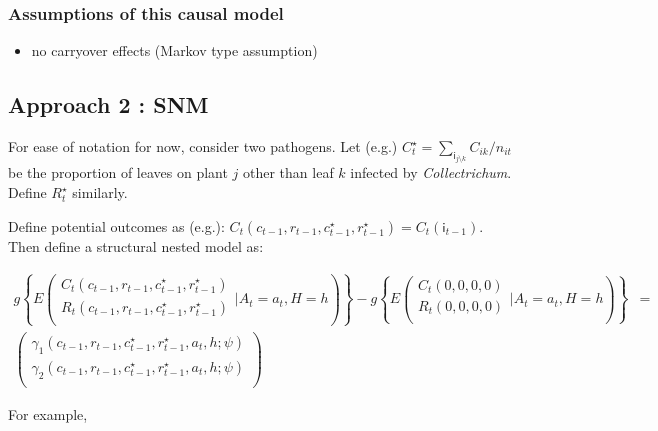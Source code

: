 \documentclass[]{article}
\providecommand{\tightlist}{%
  \setlength{\itemsep}{0pt}\setlength{\parskip}{0pt}}
\begin{document}
\hypertarget{causal_assumptions}{%
\subsubsection{Assumptions of this causal
model}\label{causal_assumptions}}

\begin{itemize}
\tightlist
\item
  no carryover effects (Markov type assumption)
\end{itemize}

\hypertarget{approach-2-snm}{%
\subsection{Approach 2 : SNM}\label{approach-2-snm}}

For ease of notation for now, consider two pathogens. Let (e.g.)
\(C^{\star}_t = \sum_{\mathsf{i}_{j \setminus k}} C_{ik}/n_{it}\) be the
proportion of leaves on plant \(j\) other than leaf \(k\) infected by
\emph{Collectrichum}. Define \(R^{\star}_t\) similarly.

Define potential outcomes as (e.g.):
\(C_t(c_{t-1}, r_{t-1}, c^{\star}_{t-1}, r^{\star}_{t-1}) = C_t(\mathsf{i}_{t -1})\).
Then define a structural nested model as:

\begin{align*}
g \left\{ E \left( 
 \begin{array}{l}
  C_t(c_{t-1}, r_{t-1}, c^{\star}_{t-1}, r^{\star}_{t-1}) \\
  R_t(c_{t-1}, r_{t-1}, c^{\star}_{t-1}, r^{\star}_{t-1}) \\
 \end{array} \bigg| A_t = a_t, H = h
\right)  \right\} -  
g \left\{ E \left( 
 \begin{array}{l}
  C_t(0, 0, 0, 0) \\
  R_t(0, 0, 0, 0) \\
 \end{array} \bigg| A_t = a_t, H = h
\right)  \right\} &= \\ 
\begin{pmatrix}
\gamma_1(c_{t-1}, r_{t-1}, c^{\star}_{t-1}, r^{\star}_{t-1}, a_t, h; \psi) \\
\gamma_2(c_{t-1}, r_{t-1}, c^{\star}_{t-1}, r^{\star}_{t-1}, a_t, h; \psi) \\
\end{pmatrix}
\end{align*}

For example,
\end{document}

